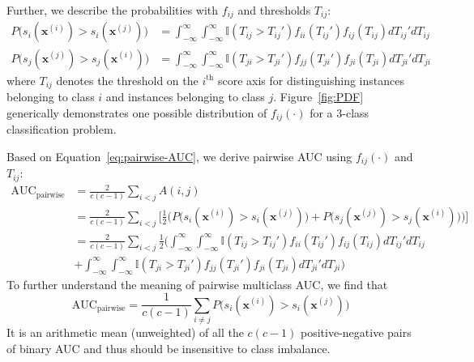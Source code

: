\documentclass[twoside,11pt]{article}
\renewcommand{\>}{{\rightarrow}}
\newcommand{\1}{{\mathbf 1}}
\newcommand{\0}{{\mathbf 0}}
\begin{document}
Further, we describe the probabilities with $f_{ij}$ and thresholds $T_{ij}$:
\begin{align}
    P\big(s_i(\mathbf{x}^{(i)}) > s_i(\mathbf{x}^{(j)})\big) &= \int_{−\infty}^{\infty}\int_{−\infty}^{\infty}\mathbb{I}(T_{ij}>T_{ij}')f_{ii}(T_{ij}')f_{ij}(T_{ij})dT_{ij}'dT_{ij} \\
    P\big(s_j(\mathbf{x}^{(j)}) > s_j(\mathbf{x}^{(i)})\big) &= \int_{−\infty}^{\infty}\int_{−\infty}^{\infty}\mathbb{I}(T_{ji}>T_{ji}')f_{jj}(T_{ji}')f_{ji}(T_{ji})dT_{ji}'dT_{ji}
\end{align}
where $T_{ij}$ denotes the threshold on the $i^{\text{th}}$ score axis for distinguishing instances belonging to class $i$ and instances belonging to class $j$. Figure~\ref{fig:PDF} generically demonstrates one possible distribution of $f_{ij}(\cdot)$ for a 3-class classification problem.

Based on Equation~\ref{eq:pairwise-AUC}, we derive pairwise AUC using $f_{ij}(\cdot)$ and $T_{ij}$:
\begin{align}
    \text{AUC}_{\text{pairwise}} &= \frac{2}{c(c-1)}\sum\limits_{i<j}A(i,j) \\
    &= \frac{2}{c(c-1)}\sum\limits_{i<j} \Big[\frac{1}{2}\Big( P\big(s_i(\mathbf{x}^{(i)}) > s_i(\mathbf{x}^{(j)})\big) + P\big(s_j(\mathbf{x}^{(j)}) > s_j(\mathbf{x}^{(i)})\big) \Big)\Big] \\
    &= \frac{2}{c(c-1)}\sum\limits_{i<j}\frac{1}{2}\Big(\int_{−\infty}^{\infty}\int_{−\infty}^{\infty}\mathbb{I}(T_{ij}>T_{ij}')f_{ii}(T_{ij}')f_{ij}(T_{ij})dT_{ij}'dT_{ij} \\& +\int_{−\infty}^{\infty}\int_{−\infty}^{\infty}\mathbb{I}(T_{ji}>T_{ji}')f_{jj}(T_{ji}')f_{ji}(T_{ji})dT_{ji}'dT_{ji}\Big)
\end{align}
To further understand the meaning of pairwise multiclass AUC, we find that
\begin{equation}
    \text{AUC}_{\text{pairwise}} = \frac{1}{c(c-1)} \sum\limits_{i \neq j} P\big(s_i(\mathbf{x}^{(i)}) > s_i(\mathbf{x}^{(j)})\big) %
\end{equation}
It is an arithmetic mean (unweighted) of all the $c(c-1)$ positive-negative pairs of binary AUC and thus should be insensitive to class imbalance.
\end{document}
